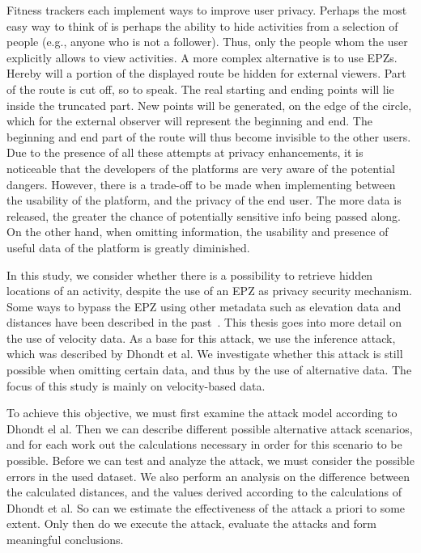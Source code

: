 \documentclass[conference]{IEEEtran}
\begin{document}
Fitness trackers each implement ways to improve user privacy. Perhaps the most
easy way to think of is perhaps the ability to hide activities from a selection
of people (e.g., anyone who is not a follower). Thus, only the people whom the
user explicitly allows to view activities. A more complex alternative is to use
EPZs. Hereby will a portion of the displayed route be hidden for external
viewers. Part of the route is cut off, so to speak. The real starting and
ending points will lie inside the truncated part. New points will be generated,
on the edge of the circle, which for the external observer will represent the
beginning and end. The beginning and end part of the route will thus become
invisible to the other users. Due to the presence of all these attempts at
privacy enhancements, it is noticeable that the developers of the platforms are
very aware of the potential dangers. However, there is a trade-off to be made
when implementing between the usability of the platform, and the privacy of the
end user. The more data is released, the greater the chance of potentially
sensitive info being passed along. On the other hand, when omitting
information, the usability and presence of useful data of the platform is
greatly diminished.

In this study, we consider whether there is a possibility to retrieve hidden
locations of an activity, despite the use of an EPZ as privacy security
mechanism. Some ways to bypass the EPZ using other metadata such as elevation
data and distances have been described in the past~\cite{Verdonck_2022, Dhondt,
    sec18has3:online}. This thesis goes into more detail on the use of velocity
data. As a base for this attack, we use the inference attack, which was
described by Dhondt et al. We investigate whether this attack is still possible
when omitting certain data, and thus by the use of alternative data. The focus
of this study is mainly on velocity-based data.

To achieve this objective, we must first examine the attack model according to
Dhondt el al. Then we can describe different possible alternative attack
scenarios, and for each work out the calculations necessary in order for this
scenario to be possible. Before we can test and analyze the attack, we must
consider the possible errors in the used dataset. We also perform an analysis
on the difference between the calculated distances, and the values derived
according to the calculations of Dhondt et al. So can we estimate the
effectiveness of the attack a priori to some extent. Only then do we execute
the attack, evaluate the attacks and form meaningful conclusions.
\end{document}
